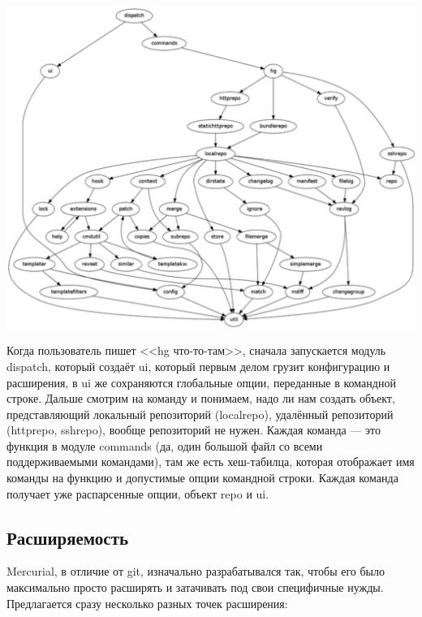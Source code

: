 \documentclass[a5paper]{article}
\begin{document}
\begin{center}
    \includegraphics[width=\textwidth]{mercurialImportGraph.png}
\end{center}

Когда пользователь пишет <<hg что-то-там>>, сначала запускается модуль dispatch, который создаёт ui, который первым делом грузит конфигурацию и расширения, в ui же сохраняются глобальные опции, переданные в командной строке. Дальше смотрим на команду и понимаем, надо ли нам создать объект, представляющий локальный репозиторий (localrepo), удалённый репозиторий (httprepo, sshrepo), вообще репозиторий не нужен. Каждая команда --- это функция в модуле commands (да, один большой файл со всеми поддерживаемыми командами), там же есть хеш-табилца, которая отображает имя команды на функцию и допустимые опции командной строки. Каждая команда получает уже распарсенные опции, объект repo и ui.

\subsection{Расширяемость}

Mercurial, в отличие от git, изначально разрабатывался так, чтобы его было максимально просто расширять и затачивать под свои специфичные нужды. Предлагается сразу несколько разных точек расширения:
\end{document}
